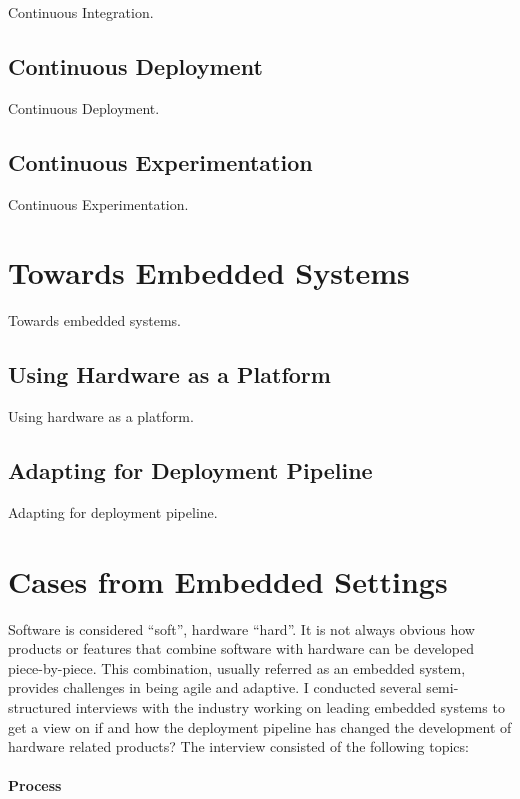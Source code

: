 \documentclass[english]{tktltiki2}
\begin{document}
Continuous Integration.

\subsection{Continuous Deployment}

Continuous Deployment.

\subsection{Continuous Experimentation}

Continuous Experimentation.


\section{Towards Embedded Systems}

Towards embedded systems.

\subsection{Using Hardware as a Platform}

Using hardware as a platform.

\subsection{Adapting for Deployment Pipeline}

Adapting for deployment pipeline.


\section{Cases from Embedded Settings}

Software is considered “soft”, hardware “hard”. It is not always obvious how products or features that combine software with hardware can be developed piece-by-piece. This combination, usually referred as an embedded system, provides challenges in being agile and adaptive. I conducted several semi-structured interviews with the industry working on leading embedded systems to get a view on if and how the deployment pipeline has changed the development of hardware related products? The interview consisted of the following topics:

\paragraph{Process}
\end{document}
